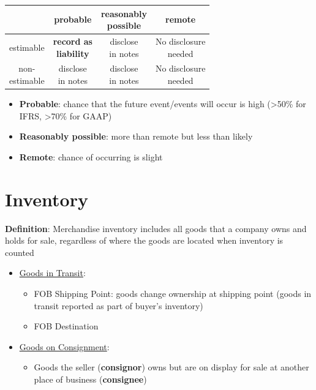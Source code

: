 \documentclass{article}
\begin{document}
\begin{multicols}{2}
\begin{itemize}
\centering
\begin{tabular}{c|c|c|c}
& probable & \makecell[c]{reasonably\\possible} & remote \\
\hline
estimable & \makecell[c]{\textbf{record as}\\\textbf{liability}} & \makecell[c]{disclose\\in notes} & \makecell[c]{No disclosure\\needed}\\
\hline
\makecell[c]{non-\\estimable} & \makecell[c]{disclose\\in notes} & \makecell[c]{disclose\\in notes} & \makecell[c]{No disclosure\\needed}\\
\end{tabular}\vspace{0.5em}
\begin{itemize}
	\item \textbf{Probable}: chance that the future event/events will occur is high (>50\% for IFRS, >70\% for GAAP)
	\item \textbf{Reasonably possible}: more than remote but less than likely
	\item \textbf{Remote}: chance of occurring is slight
\end{itemize}
\end{itemize}


\section{Inventory}
\textbf{Definition}: Merchandise inventory includes all goods that a company owns and holds for sale, regardless of where the goods are located when inventory is counted
\begin{itemize}
	\item \underline{Goods in Transit}:
	\begin{itemize}
		\item FOB Shipping Point: goods change ownership at shipping point (goods in transit reported as part of buyer's inventory)
		\item FOB Destination
	\end{itemize}
    \item \underline{Goods on Consignment}:
    \begin{itemize}
    	\item Goods the seller (\textbf{consignor}) owns but are on display for sale at another place of business (\textbf{consignee})
    \end{itemize}
\end{itemize}


\end{multicols}
\end{document}
